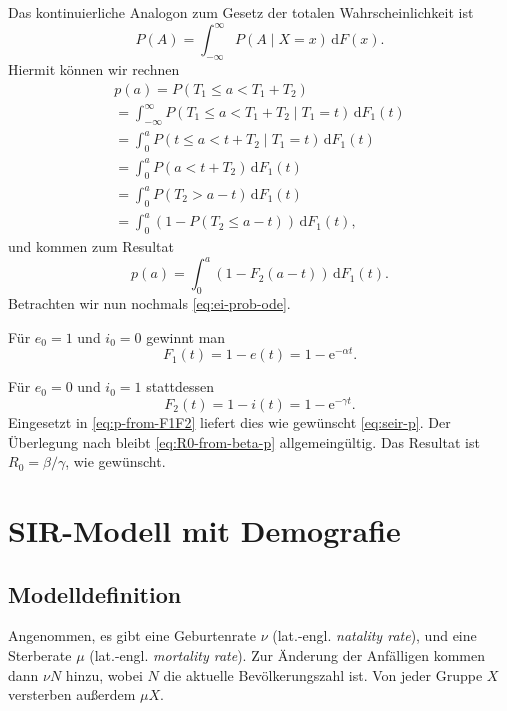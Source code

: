 \documentclass[a4paper,10pt,fleqn,twocolumn,twoside,dvipdfmx]{scrartcl}
\numberwithin{equation}{section}
\newcommand{\ee}{\mathrm e}
\begin{document}
Das kontinuierliche Analogon zum Gesetz der totalen
Wahrscheinlichkeit ist
\begin{equation}
P(A) = \int_{-\infty}^\infty P(A\mid X=x)\,\mathrm dF(x).
\end{equation}
Hiermit können wir rechnen
\begin{gather*}
p(a) = P(T_1\le a < T_1+T_2)\\
= \int_{-\infty}^\infty P(T_1\le a < T_1+T_2\mid T_1=t)\,\mathrm dF_1(t)\\
= \int_0^a P(t\le a < t+T_2 \mid T_1=t)\,\mathrm dF_1(t)\\
= \int_0^a P(a < t+T_2)\,\mathrm dF_1(t)\\
= \int_0^a P(T_2 > a-t)\,\mathrm dF_1(t)\\
= \int_0^a (1-P(T_2\le a-t))\,\mathrm dF_1(t),
\end{gather*}
und kommen zum Resultat
\begin{equation}\label{eq:p-from-F1F2}
p(a) = \int_0^a (1-F_2(a-t))\,\mathrm dF_1(t).
\end{equation}
Betrachten wir nun nochmals \eqref{eq:ei-prob-ode}.

Für $e_0=1$ und $i_0=0$ gewinnt man
\begin{equation}
F_1(t) = 1-e(t) = 1-\ee^{-\alpha t}.
\end{equation}

Für $e_0=0$ und $i_0=1$ stattdessen
\begin{equation}
F_2(t) = 1-i(t) = 1-\ee^{-\gamma t}.
\end{equation}
Eingesetzt in \eqref{eq:p-from-F1F2} liefert dies
wie gewünscht \eqref{eq:seir-p}. Der Überlegung nach bleibt
\eqref{eq:R0-from-beta-p} allgemeingültig. Das Resultat
ist $R_0=\beta/\gamma$, wie gewünscht.


\section{SIR-Modell mit Demografie}
\subsection{Modelldefinition}
Angenommen, es gibt eine Geburtenrate $\nu$ (lat.-engl. \emph{natality rate}), 
und eine Sterberate $\mu$ (lat.-engl. \emph{mortality rate}). Zur Änderung der
Anfälligen kommen dann $\nu N$ hinzu, wobei $N$ die aktuelle
Bevölkerungszahl ist. Von jeder Gruppe $X$ versterben außerdem $\mu X$.
\end{document}
